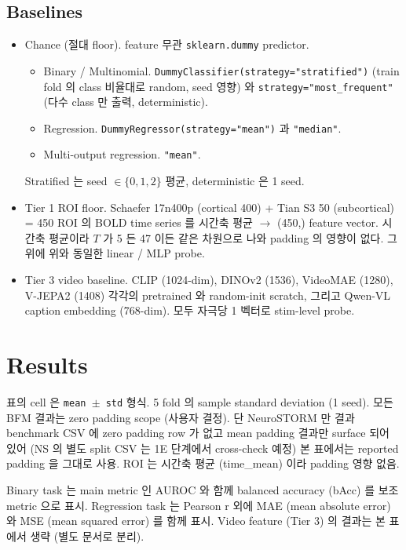 \documentclass[a4paper,11pt]{article}
\begin{document}
\subsection{Baselines}

\begin{itemize}[leftmargin=*, itemsep=2pt]
  \item Chance (절대 floor). feature 무관 \texttt{sklearn.dummy} predictor.
    \begin{itemize}
      \item Binary / Multinomial. \texttt{DummyClassifier(strategy="stratified")} (train fold 의 class 비율대로 random, seed 영향) 와 \texttt{strategy="most\_frequent"} (다수 class 만 출력, deterministic).
      \item Regression. \texttt{DummyRegressor(strategy="mean")} 과 \texttt{"median"}.
      \item Multi-output regression. \texttt{"mean"}.
    \end{itemize}
    Stratified 는 seed $\in\{0,1,2\}$ 평균, deterministic 은 1 seed.
  \item Tier 1 ROI floor. Schaefer 17n400p (cortical 400) + Tian S3 50 (subcortical) = 450 ROI 의 BOLD time series 를 시간축 평균 $\to$ (450,) feature vector. 시간축 평균이라 $T$ 가 5 든 47 이든 같은 차원으로 나와 padding 의 영향이 없다. 그 위에 위와 동일한 linear / MLP probe.
  \item Tier 3 video baseline. CLIP (1024-dim), DINOv2 (1536), VideoMAE (1280), V-JEPA2 (1408) 각각의 pretrained 와 random-init scratch, 그리고 Qwen-VL caption embedding (768-dim). 모두 자극당 1 벡터로 stim-level probe.
\end{itemize}

\section{Results}

표의 cell 은 \texttt{mean $\pm$ std} 형식. 5 fold 의 sample standard deviation (1 seed). 모든 BFM 결과는 zero padding scope (사용자 결정). 단 NeuroSTORM 만 결과 benchmark CSV 에 zero padding row 가 없고 mean padding 결과만 surface 되어 있어 (NS 의 별도 split CSV 는 1E 단계에서 cross-check 예정) 본 표에서는 reported padding 을 그대로 사용. ROI 는 시간축 평균 (time\_mean) 이라 padding 영향 없음.

Binary task 는 main metric 인 AUROC 와 함께 balanced accuracy (bAcc) 를 보조 metric 으로 표시. Regression task 는 Pearson r 외에 MAE (mean absolute error) 와 MSE (mean squared error) 를 함께 표시. Video feature (Tier 3) 의 결과는 본 표에서 생략 (별도 문서로 분리).
\end{document}
